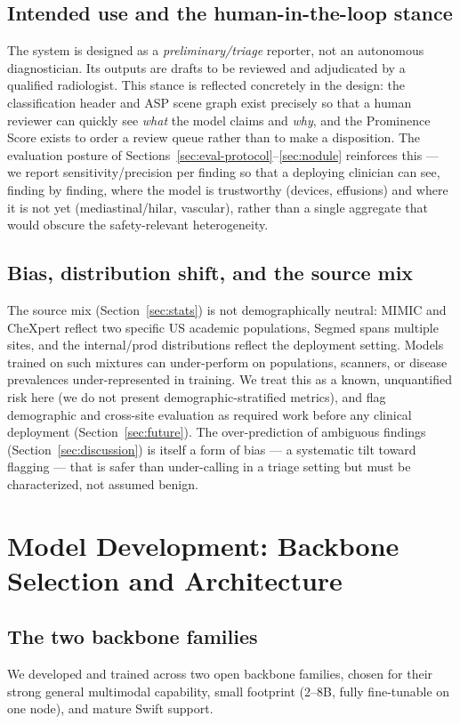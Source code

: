 \documentclass[11pt,a4paper]{article}
\begin{document}
\subsection{Intended use and the human-in-the-loop stance}
The system is designed as a \emph{preliminary/triage} reporter, not an autonomous diagnostician. Its outputs are drafts to be reviewed and adjudicated by a qualified radiologist. This stance is reflected concretely in the design: the classification header and ASP scene graph exist precisely so that a human reviewer can quickly see \emph{what} the model claims and \emph{why}, and the Prominence Score exists to order a review queue rather than to make a disposition. The evaluation posture of Sections~\ref{sec:eval-protocol}--\ref{sec:nodule} reinforces this --- we report sensitivity/precision per finding so that a deploying clinician can see, finding by finding, where the model is trustworthy (devices, effusions) and where it is not yet (mediastinal/hilar, vascular), rather than a single aggregate that would obscure the safety-relevant heterogeneity.

\subsection{Bias, distribution shift, and the source mix}
The source mix (Section~\ref{sec:stats}) is not demographically neutral: MIMIC and CheXpert reflect two specific US academic populations, Segmed spans multiple sites, and the internal/prod distributions reflect the deployment setting. Models trained on such mixtures can under-perform on populations, scanners, or disease prevalences under-represented in training. We treat this as a known, unquantified risk here (we do not present demographic-stratified metrics), and flag demographic and cross-site evaluation as required work before any clinical deployment (Section~\ref{sec:future}). The over-prediction of ambiguous findings (Section~\ref{sec:discussion}) is itself a form of bias --- a systematic tilt toward flagging --- that is safer than under-calling in a triage setting but must be characterized, not assumed benign.

\section{Model Development: Backbone Selection and Architecture}
\label{sec:backbone}

\subsection{The two backbone families}
We developed and trained across two open backbone families, chosen for their strong general multimodal capability, small footprint (2--8B, fully fine-tunable on one node), and mature Swift support.
\end{document}
